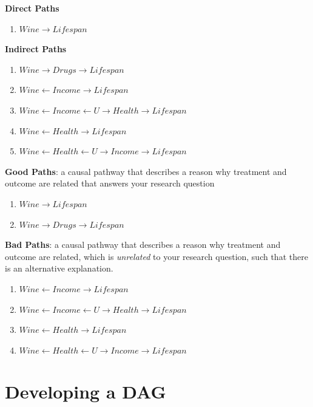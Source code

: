 \documentclass[
]{book}
\providecommand{\tightlist}{%
  \setlength{\itemsep}{0pt}\setlength{\parskip}{0pt}}
\begin{document}
\textbf{Direct Paths}

\begin{enumerate}
\def\labelenumi{\arabic{enumi}.}
\tightlist
\item
  \(Wine \rightarrow Lifespan\)
\end{enumerate}

\textbf{Indirect Paths}

\begin{enumerate}
\def\labelenumi{\arabic{enumi}.}
\tightlist
\item
  \(Wine \rightarrow Drugs \rightarrow Lifespan\)
\item
  \(Wine \leftarrow Income \rightarrow Lifespan\)
\item
  \(Wine \leftarrow Income \leftarrow U \rightarrow Health \rightarrow Lifespan\)
\item
  \(Wine \leftarrow Health \rightarrow Lifespan\)
\item
  \(Wine \leftarrow Health \leftarrow U \rightarrow Income \rightarrow Lifespan\)
\end{enumerate}

\textbf{Good Paths}: a causal pathway that describes a reason why treatment and outcome are related that answers your research question

\begin{enumerate}
\def\labelenumi{\arabic{enumi}.}
\tightlist
\item
  \(Wine \rightarrow Lifespan\)
\item
  \(Wine \rightarrow Drugs \rightarrow Lifespan\)
\end{enumerate}

\textbf{Bad Paths}: a causal pathway that describes a reason why treatment and outcome are related, which is \emph{unrelated} to your research question, such that there is an alternative explanation.

\begin{enumerate}
\def\labelenumi{\arabic{enumi}.}
\tightlist
\item
  \(Wine \leftarrow Income \rightarrow Lifespan\)
\item
  \(Wine \leftarrow Income \leftarrow U \rightarrow Health \rightarrow Lifespan\)
\item
  \(Wine \leftarrow Health \rightarrow Lifespan\)
\item
  \(Wine \leftarrow Health \leftarrow U \rightarrow Income \rightarrow Lifespan\)
\end{enumerate}

\chapter{Developing a DAG}\label{developing-a-dag}
\end{document}
